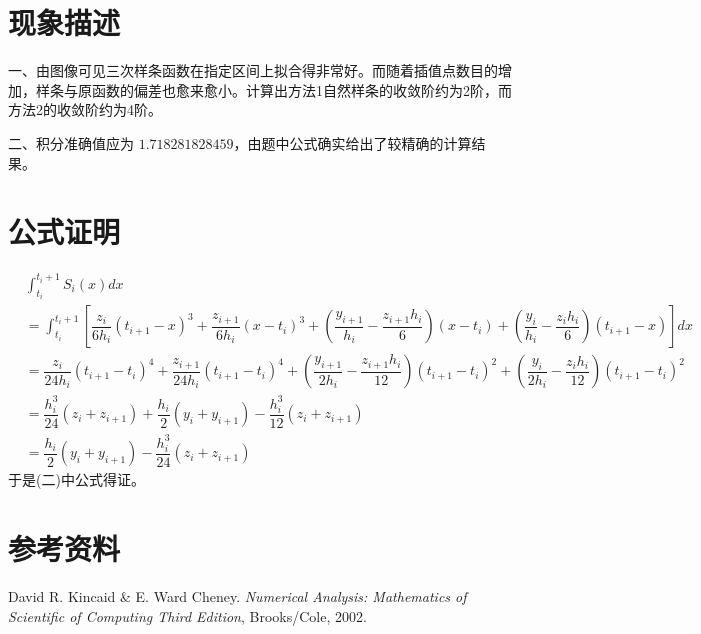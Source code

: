 \documentclass{ctexart}
\begin{document}
\section*{现象描述}
	\noindent 一、由图像可见三次样条函数在指定区间上拟合得非常好。而随着插值点数目的增加，样条与原函数的偏差也愈来愈小。计算出方法1自然样条的收敛阶约为2阶，而方法2的收敛阶约为4阶。
	
	\noindent 二、积分准确值应为 $1.718281828459$，由题中公式确实给出了较精确的计算结果。
\section*{公式证明}
	\begin{align*}
		&\int_{t_i}^{t_i+1}S_i(x)dx \\
		&= \int_{t_i}^{t_i+1}\left[\dfrac{z_i}{6h_i}(t_{i+1} - x)^3 + \dfrac{z_{i+1}}{6h_i}(x - t_i)^3 + (\dfrac{y_{i+1}}{h_i} - \dfrac{z_{i+1} h_i}{6})(x - t_i) + (\dfrac{y_i}{h_i} - \dfrac{z_i h_i}{6})(t_{i+1} - x)\right]dx \\
		&= \dfrac{z_i}{24h_i}(t_{i+1} - t_i)^4 + \dfrac{z_{i+1}}{24h_i}(t_{i+1} - t_i)^4 + (\dfrac{y_{i+1}}{2h_i} - \dfrac{z_{i+1} h_i}{12})(t_{i+1} - t_i)^2 + (\dfrac{y_i}{2h_i} - \dfrac{z_i h_i}{12})(t_{i+1} - t_i)^2\\
		&= \dfrac{h_i^3}{24}(z_i + z_{i+1}) + \dfrac{h_i}{2}(y_i + y_{i+1}) - \dfrac{h_i^3}{12}(z_i + z_{i+1})\\
		&= \dfrac{h_i}{2}(y_i + y_{i+1}) - \dfrac{h_i^3}{24}(z_i + z_{i+1})
	\end{align*}
	于是(二)中公式得证。
	
\section*{参考资料}
	\noindent [1] David R. Kincaid \& E. Ward Cheney. {\it Numerical Analysis: Mathematics of Scientific of Computing Third Edition}, Brooks/Cole, 2002.
\end{document}
